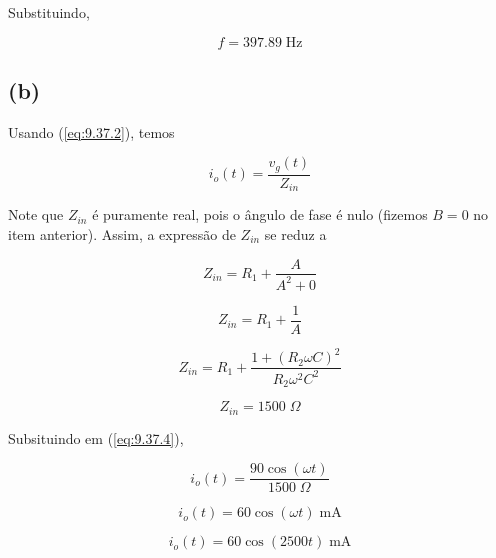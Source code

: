 Substituindo,

\[ \boxed{f = 397.89 \; \textrm{Hz}}  \]

\subsection*{(b)}

Usando (\ref{eq:9.37.2}), temos

\begin{equation}\label{eq:9.37.4}
    i_o(t) = \frac{v_g(t)}{Z_{in}}
\end{equation}

Note que $Z_{in}$ é puramente real, pois o ângulo de fase é nulo (fizemos $B = 0$ no item anterior). Assim, a expressão de 
$Z_{in}$ se reduz a 

\[ Z_{in} = R_1 + \frac{A}{A^2 + 0} \]

\[ Z_{in} = R_1 + \frac{1}{A} \]

\[ Z_{in} = R_1 + \frac{1 + (R_2\omega C)^2}{R_2\omega^2C^2} \]

\[ Z_{in} = 1500 \; \Omega \]

Subsituindo em (\ref{eq:9.37.4}),

\[ i_o(t) = \frac{90\cos(\omega t)}{1500 \; \Omega} \]

\[ i_o(t) = 60\cos(\omega t) \; \textrm{mA} \]

\[ \boxed{i_o(t) = 60\cos(2500 t) \; \textrm{mA}}  \]












